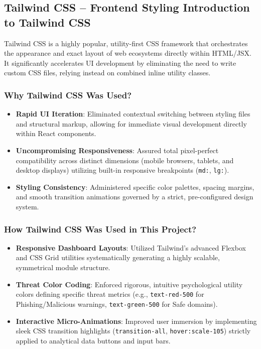 \subsection{Tailwind CSS -- Frontend Styling Introduction to Tailwind CSS}
\noindent
Tailwind CSS is a highly popular, utility-first CSS framework that orchestrates the appearance and exact layout of web ecosystems directly within HTML/JSX. It significantly accelerates UI development by eliminating the need to write custom CSS files, relying instead on combined inline utility classes.

\subsubsection*{Why Tailwind CSS Was Used?}

\begin{itemize}
\item \textbf{Rapid UI Iteration}: Eliminated contextual switching between styling files and structural markup, allowing for immediate visual development directly within React components.
\item \textbf{Uncompromising Responsiveness}: Assured total pixel-perfect compatibility across distinct dimensions (mobile browsers, tablets, and desktop displays) utilizing built-in responsive breakpoints (\texttt{md:}, \texttt{lg:}).
\item \textbf{Styling Consistency}: Administered specific color palettes, spacing margins, and smooth transition animations governed by a strict, pre-configured design system.
\end{itemize}

\subsubsection*{How Tailwind CSS Was Used in This Project?}

\begin{itemize}
\item \textbf{Responsive Dashboard Layouts}: Utilized Tailwind's advanced Flexbox and CSS Grid utilities systematically generating a highly scalable, symmetrical module structure.
\item \textbf{Threat Color Coding}: Enforced rigorous, intuitive psychological utility colors defining specific threat metrics (e.g., \texttt{text-red-500} for Phishing/Malicious warnings, \texttt{text-green-500} for Safe domains).
\item \textbf{Interactive Micro-Animations}: Improved user immersion by implementing sleek CSS transition highlights (\texttt{transition-all}, \texttt{hover:scale-105}) strictly applied to analytical data buttons and input bars.
\end{itemize}

